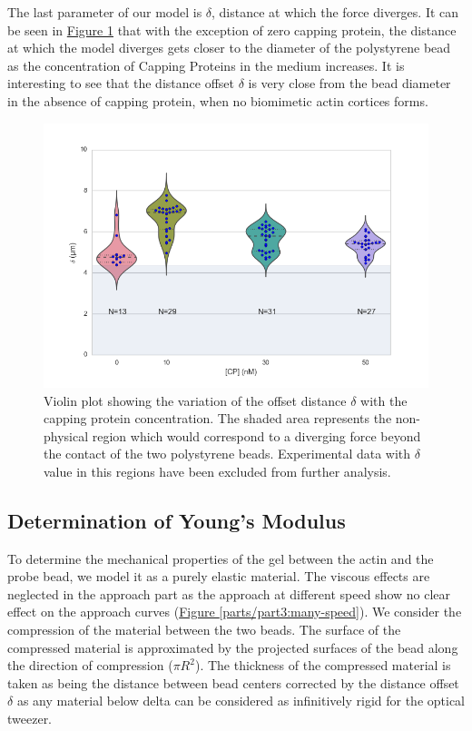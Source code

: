 \documentclass[A4paperpaper,11pt,english]{sphinxmanual}
\begin{document}
The last parameter of our model is \(\delta\), distance at which the force
diverges.   It can be seen in \hyperref[parts/part3:delta-violin]{Figure  \ref*{parts/part3:delta-violin}} that with the exception
of zero capping protein, the distance at which the model diverges gets
closer to the diameter of the polystyrene bead as the concentration of Capping
Proteins in the medium increases. It is interesting to see that the distance offset
\(\delta\) is very close from the bead diameter in the absence of capping protein, when no
biomimetic actin cortices forms.
\begin{figure}[htbp]
\centering
\capstart

\includegraphics[width=0.800\linewidth]{delta_violin.png}
\caption{Violin plot showing the variation of the offset distance \(\delta\)
with the capping protein concentration. The shaded area represents the
non-physical region which would correspond to a diverging force beyond the
contact of the two polystyrene beads. Experimental data with \(\delta\)
value in this regions have been excluded from further analysis.}\label{parts/part3:delta-violin}\end{figure}


\subsection{Determination of Young's Modulus}
\label{parts/part3:determination-of-young-s-modulus}
To determine the mechanical properties of the gel between the actin and the
probe bead, we model it as a purely elastic material. The viscous effects are
neglected in the approach part as the approach at different speed show no
clear effect on the approach curves (\hyperref[parts/part3:many-speed]{Figure  \ref*{parts/part3:many-speed}}). We consider
the compression of the material between the two beads. The surface of the
compressed material is approximated by the projected surfaces of the bead along the
direction of compression (\(\pi R^2\)).  The thickness of the compressed
material is taken as being the distance between bead centers corrected by the
distance offset \(\delta\) as any material below delta can be considered as
infinitively rigid for the optical tweezer.
\end{document}
